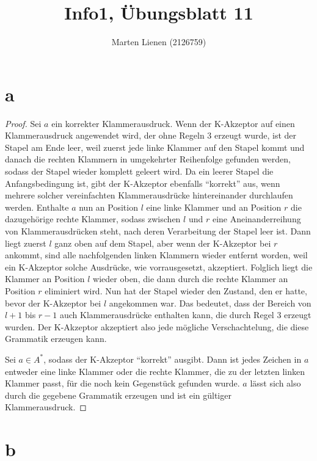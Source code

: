 \documentclass[a4paper,10pt]{article}
\title{Info1, Übungsblatt 11}
\author{Marten Lienen (2126759)}
\begin{document}
\maketitle

\section*{a}

\begin{proof}
 Sei $a$ ein korrekter Klammerausdruck.
 Wenn der K-Akzeptor auf einen Klammerausdruck angewendet wird, der ohne Regeln 3 erzeugt wurde, ist der Stapel am Ende leer, weil zuerst jede linke Klammer auf den Stapel kommt und danach die rechten Klammern in umgekehrter Reihenfolge gefunden werden, sodass der Stapel wieder komplett geleert wird.
 Da ein leerer Stapel die Anfangsbedingung ist, gibt der K-Akzeptor ebenfalls ``korrekt'' aus, wenn mehrere solcher vereinfachten Klammerausdrücke hintereinander durchlaufen werden.
 Enthalte $a$ nun an Position $l$ eine linke Klammer und an Position $r$ die dazugehörige rechte Klammer, sodass zwischen $l$ und $r$ eine Aneinanderreihung von Klammerausdrücken steht, nach deren Verarbeitung der Stapel leer ist.
 Dann liegt zuerst $l$ ganz oben auf dem Stapel, aber wenn der K-Akzeptor bei $r$ ankommt, sind alle nachfolgenden linken Klammern wieder entfernt worden, weil ein K-Akzeptor solche Ausdrücke, wie vorrausgesetzt, akzeptiert.
 Folglich liegt die Klammer an Position $l$ wieder oben, die dann durch die rechte Klammer an Position $r$ eliminiert wird.
 Nun hat der Stapel wieder den Zustand, den er hatte, bevor der K-Akzeptor bei $l$ angekommen war.
 Das bedeutet, dass der Bereich von $l + 1$ bis $r - 1$ auch Klammerausdrücke enthalten kann, die durch Regel 3 erzeugt wurden.
 Der K-Akzeptor akzeptiert also jede mögliche Verschachtelung, die diese Grammatik erzeugen kann.
 
 Sei $a \in A^*$, sodass der K-Akzeptor ``korrekt'' ausgibt.
 Dann ist jedes Zeichen in $a$ entweder eine linke Klammer oder die rechte Klammer, die zu der letzten linken Klammer passt, für die noch kein Gegenstück gefunden wurde.
 $a$ lässt sich also durch die gegebene Grammatik erzeugen und ist ein gültiger Klammerausdruck.
\end{proof}

\section*{b}
\end{document}
